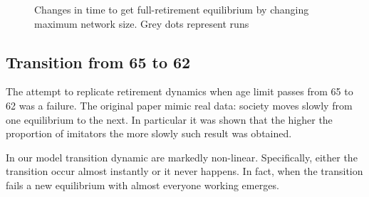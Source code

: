 \documentclass[runningheads,a4paper]{llncs}
\begin{document}
\begin{figure}
\centering

\caption{Changes in time to get full-retirement equilibrium by changing maximum network size. Grey dots represent runs}
\label{figure8}
\end{figure}

\subsection{Transition from 65 to 62}

The attempt to replicate retirement dynamics when age limit passes from 65 to 62 was a failure.
The original paper mimic real data: society moves slowly from one equilibrium to the next.
In particular it was shown that the higher the proportion of imitators the more slowly such result was obtained.

In our model transition dynamic are markedly non-linear.
Specifically, either the transition occur almost instantly or it never happens.
In fact, when the transition fails a new equilibrium with almost everyone working emerges.
\end{document}
